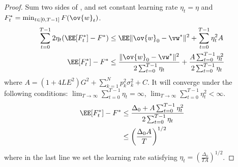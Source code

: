 \begin{proof}
Sum two sides of \eq{\ref{eq:cvxsgd1}}, and set constant learning rate $\eta_t = \eta$ and $F^*_t = \min_{t \in [0, T-1]} F(\ov{w}_t)$.
\begin{align*}
    \sum_{t=0}^{T-1} 2\eta_t (\EE[F^*_t] - F^* ) & \leq \EE \|\ov{w}_{0}-\vw^{*}\|^{2} + \sum_{t=0}^{T-1}\eta_t^2 A\\
\EE[ F_t^*] - F^*  & \leq \frac{\|\ov{w}_{0}-\vw^{*}\|^{2}}{2 \sum_{t=0}^{T-1} \eta_t } + \frac{A \sum_{t=0}^{T-1} \eta_t^2}{2 \sum_{t=0}^{T-1} \eta_t }
\end{align*}
where $A = (1 +4 L E^{2})G^{2} + \sum_{k=1}^{N} p_{k}^{2}\sigma_k^2 + C$.
It will converge under the following conditions: $ \lim_{T \rightarrow \infty }\sum_{t=0}^{T-1} \eta_t = \infty$, 
$ \lim_{T \rightarrow \infty }\sum_{t=0}^{T-1} \eta_t^2 < \infty$. 
\begin{align*}
	\EE[ F_t^*] - F^*  & \leq \frac{\Delta_0 + A \sum_{t=0}^{T-1} \eta_t^2 }{2 \sum_{t=0}^{T-1} \eta_t }\\
	& \leq \left(\frac{ \Delta_0 A }{T}\right)^{1/2}
\end{align*}
where in the last line we set the learning rate satisfying $\eta_t =  \left(\frac{\Delta_0}{ TA }\right)^{1/2}$.
\end{proof}





